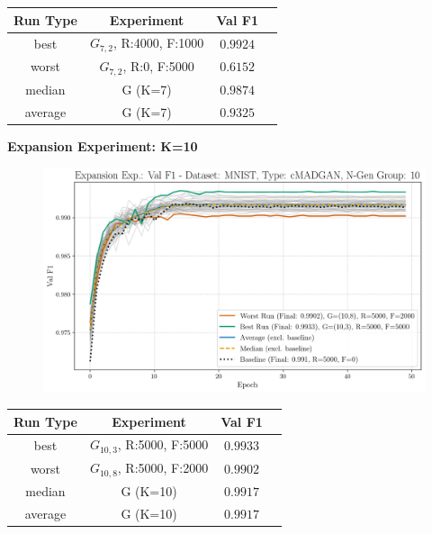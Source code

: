 \begin{table}[H]
	\vspace{-1em}
	\centering
	\begin{tabular}{|c|c|c|c|}
		\hline
		Run Type & Experiment & Val F1 \\ \hline
		best & \(G_{7, 2}\), R:4000, F:1000 & $0.9924$\\ \hline
		worst & \(G_{7, 2}\), R:0, F:5000 & $0.6152$\\ \hline
		median & G (K=7) & $0.9874$\\ \hline
		average & G (K=7) & $0.9325$
		\\ \hline
	\end{tabular}
\end{table}
\newpage
\noindent\textbf{Expansion Experiment: K=10}
\begin{figure}[htbp]
	\centering
	\includegraphics[width=.85\textwidth]{abb/strat_classifier_performance/MNIST_STRATIFIED_CLASSIFIERS_cMADGAN_NEW/expansion_experiments/val_f1_score_cMADGAN_MNIST_n_gen_10_all.png}
	\caption{ } %
	\label{fig:app_strat_class_performance_expansion__val_f1__10__example_used_1}
\end{figure}
\vspace{-1em}
\begin{table}[H]
	\vspace{-1em}
	\centering
	\begin{tabular}{|c|c|c|c|}
		\hline
		Run Type & Experiment & Val F1 \\ \hline
		best & \(G_{10, 3}\), R:5000, F:5000 & $0.9933$\\ \hline
		worst & \(G_{10, 8}\), R:5000, F:2000 & $0.9902$\\ \hline
		median & G (K=10) & $0.9917$\\ \hline
		average & G (K=10) & $0.9917$
		\\ \hline
	\end{tabular}
\end{table}

